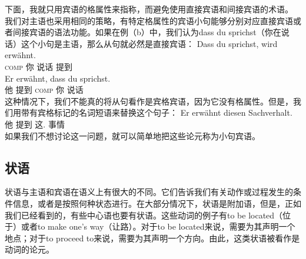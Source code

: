 下面，我就只用宾语的格属性来指称，而避免使用直接宾语和间接宾语的术语。
我们对主语也采用相同的策略，有特定格属性的宾语小句能够分别对应直接宾语或者间接宾语的语法功能。如果在例（b）中，我们认为dass du sprichst（你在说话）这个小句是主语，那么从句就必然是直接宾语：
\eal
\ex\label{Beispiel-dass-du-sprichst} 
\gll Dass du sprichst, wird erwähnt.\\
     \textsc{comp} 你 说话 \passiveprs{} 提到\\
\ex
\gll Er erwähnt, dass du sprichst.\\
	 他 提到 \textsc{comp} 你 说话\\
\zl
这种情况下，我们不能真的将从句看作是宾格宾语，因为它没有格属性。但是，我们用带有宾格标记的名词短语来替换这个句子：
\ea
\gll Er erwähnt diesen Sachverhalt.\\
	 他 提到 这.\acc{} 事情\\
\z
如果我们不想讨论这一问题，就可以简单地把这些论元称为小句宾语。


\subsection{状语}
\label{sec-Adverbiale}
状语与主语和宾语在语义上有很大的不同。它们告诉我们有关动作或过程发生的条件信息，或者是按照何种状态进行。在大部分情况下，状语是附加语，但是，正如我们已经看到的，有些中心语也要有状语。这些动词的例子有to be located（位于）或者to make one's way（让路）。对于to be located来说，需要为其声明一个地点；对于to proceed to来说，需要为其声明一个方向。由此，这类状语被看作是动词的论元。

